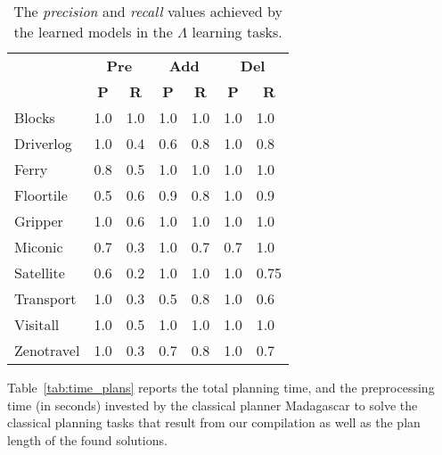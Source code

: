 \documentclass[letterpaper]{article} %
\begin{document}
\begin{table}[hbt!]
	\begin{footnotesize}
	\begin{center}
		\begin{tabular}{l|l|l|l|l|l|l|}
			 & \multicolumn{2}{|c|}{\bf Pre} & \multicolumn{2}{|c|}{\bf Add} & \multicolumn{2}{|c|}{\bf Del}  \\ \cline{2-7}			
			  & \multicolumn{1}{|c|}{\bf P} & \multicolumn{1}{|c|}{\bf R} & \multicolumn{1}{|c|}{\bf P} & \multicolumn{1}{|c|}{\bf R} & \multicolumn{1}{|c|}{\bf P} & \multicolumn{1}{|c|}{\bf R} \\
			\hline
			Blocks & 1.0 & 1.0 & 1.0 & 1.0 & 1.0 & 1.0 \\
			Driverlog & 1.0 & 0.4 & 0.6 & 0.8 & 1.0 & 0.8 \\
			Ferry & 0.8 & 0.5 & 1.0 & 1.0 & 1.0 & 1.0 \\
			Floortile & 0.5 & 0.6 & 0.9 & 0.8 & 1.0 & 0.9 \\
			Gripper & 1.0 & 0.6 & 1.0 & 1.0 & 1.0 & 1.0 \\
			Miconic & 0.7 & 0.3 & 1.0 & 0.7 & 0.7 & 1.0 \\
			Satellite & 0.6 & 0.2 & 1.0 & 1.0 & 1.0 & 0.75 \\
			Transport & 1.0 & 0.3 & 0.5 & 0.8 & 1.0 & 0.6 \\
			Visitall & 1.0 & 0.5 & 1.0 & 1.0 & 1.0 & 1.0 \\
			Zenotravel & 1.0 & 0.3 & 0.7 & 0.8 & 1.0 & 0.7
		\end{tabular}
	\end{center}
	\end{footnotesize}
\caption{\small The {\em precision} and {\em recall} values achieved by the learned models in the $\Lambda$ learning tasks.}
\label{tab:results_plans}
\end{table}

Table~\ref{tab:time_plans} reports the total planning time, and the preprocessing time (in seconds) invested by the classical planner {\sc Madagascar} to solve the classical planning tasks that result from our compilation as well as the plan length of the found solutions. 	
\end{document}
